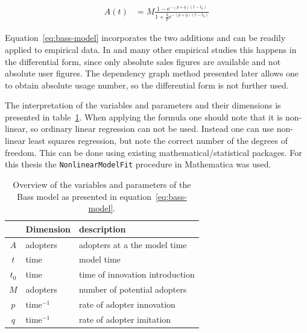 \documentclass[smallextended,final]{svjour3}
\newcommand{\e}{\mathrm{e}}
\begin{document}
\begin{align} \label{eq:bass-model}
	A(t) &= M \frac{1 - \e^{-(p+q)(t-t_0)}}{1 + \frac{q}{p}\e^{-(p+q)(t-t_0)}}
\end{align}

Equation~\eqref{eq:bass-model} incorporates the two additions and can be readily applied to empirical data. In \cite{mahajan95} and many other empirical studies this happens in the differential form, since only absolute sales figures are available and not absolute user figures. The dependency graph method presented later allows one to obtain absolute usage number, so the differential form is not further used. 


The interpretation of the variables and parameters and their dimensions is presented in table~\ref{tbl:bass-model}. When applying the formula one should note that it is non-linear, so ordinary linear regression can not be used. Instead one can use non-linear least squares regression, but note the correct number of the degrees of freedom. This can be done using existing mathematical/statistical packages. For this thesis the  \verb|NonlinearModelFit| procedure in Mathematica was used. 

\begin{table}
\centering\small
\caption[Bass model variables and parameters]{Overview of the variables and parameters of the Bass model as presented in equation~\eqref{eq:bass-model}.}
\label{tbl:bass-model}
\begin{tabular}{cll}
\toprule
& Dimension & description \\
\midrule
$A$   & adopters    & adopters at a the model time \\
$t$   & time        & model time \\
\midrule
$t_0$ & time        & time of innovation introduction \\
$M$   & adopters    & number of potential adopters \\
$p$   & time$^{-1}$ & rate of adopter innovation \\
$q$   & time$^{-1}$ & rate of adopter imitation \\
\bottomrule
\end{tabular}
\end{table}
\end{document}

